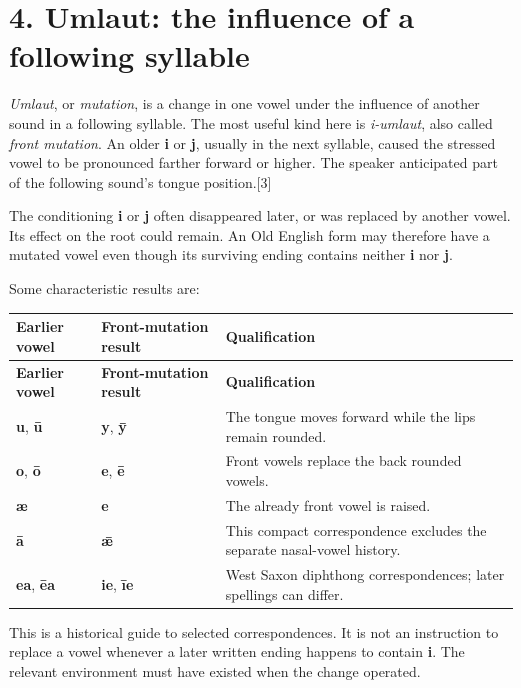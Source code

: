 \section*{4. Umlaut: the influence of a following syllable}
\emph{Umlaut}, or \emph{mutation}, is a change in one vowel under the influence of another sound in a following syllable. The most useful kind here is \emph{i-umlaut}, also called \emph{front mutation}. An older \textbf{i} or \textbf{j}, usually in the next syllable, caused the stressed vowel to be pronounced farther forward or higher. The speaker anticipated part of the following sound’s tongue position.[3]\par
The conditioning \textbf{i} or \textbf{j} often disappeared later, or was replaced by another vowel. Its effect on the root could remain. An Old English form may therefore have a mutated vowel even though its surviving ending contains neither \textbf{i} nor \textbf{j}.\par
Some characteristic results are:\par
\begingroup
\fontsize{10.5}{13.2}\selectfont
\setlength{\LTleft}{0pt}
\setlength{\LTright}{0pt plus 1fil}
\begin{longtable}{@{}>{\raggedright\arraybackslash}p{}>{\raggedright\arraybackslash}p{}>{\raggedright\arraybackslash}p{}@{}}
\toprule
\textbf{Earlier vowel} & \textbf{Front-mutation result} & \textbf{Qualification} \\
\midrule
\endfirsthead
\toprule
\textbf{Earlier vowel} & \textbf{Front-mutation result} & \textbf{Qualification} \\
\midrule
\endhead
\bottomrule
\endfoot
\bottomrule
\endlastfoot
\textbf{u}, \textbf{ū} & \textbf{y}, \textbf{ȳ} & The tongue moves forward while the lips remain rounded. \\
\textbf{o}, \textbf{ō} & \textbf{e}, \textbf{ē} & Front vowels replace the back rounded vowels. \\
\textbf{æ} & \textbf{e} & The already front vowel is raised. \\
\textbf{ā} & \textbf{ǣ} & This compact correspondence excludes the separate nasal-vowel history. \\
\textbf{ea}, \textbf{ēa} & \textbf{ie}, \textbf{īe} & West Saxon diphthong correspondences; later spellings can differ. \\
\end{longtable}
\endgroup
This is a historical guide to selected correspondences. It is not an instruction to replace a vowel whenever a later written ending happens to contain \textbf{i}. The relevant environment must have existed when the change operated.\par
